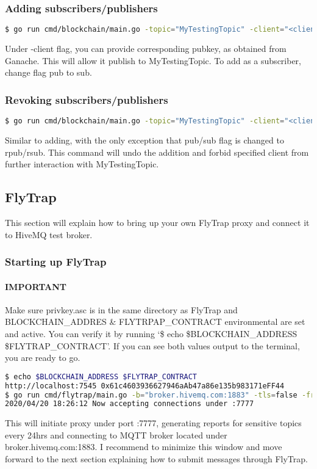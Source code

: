 \subsubsection{Adding subscribers/publishers}
\begin{lstlisting}[language=bash,breaklines=true]
$ go run cmd/blockchain/main.go -topic="MyTestingTopic" -client="<client_pubkey>" -pub="Addining a new publisher"
\end{lstlisting}
Under -client flag, you can provide corresponding pubkey, as obtained from Ganache. This will allow it publish to MyTestingTopic. To add as a subscriber, change flag pub to sub.
\subsubsection{Revoking subscribers/publishers}
\begin{lstlisting}[language=bash,breaklines=true]
$ go run cmd/blockchain/main.go -topic="MyTestingTopic" -client="<client_pubkey>" -rpub="Revoking publisher"
\end{lstlisting}
Similar to adding, with the only exception that pub/sub flag is changed to rpub/rsub. This command will undo the addition and forbid specified client from further interaction with MyTestingTopic.
\subsection{FlyTrap}
This section will explain how to bring up your own FlyTrap proxy and connect it to HiveMQ test broker.
\subsubsection{Starting up FlyTrap}
\paragraph{IMPORTANT} Make sure privkey.asc is in the same directory as FlyTrap and BLOCKCHAIN\_ADDRES \& FLYTRPAP\_CONTRACT environmental are set and active. You can verify it by running `\$ echo \$BLOCKCHAIN\_ADDRESS \$FLYTRAP\_CONTRACT'. If you can see both values output to the terminal, you are ready to go.
\begin{lstlisting}[language=bash,breaklines=true]
$ echo $BLOCKCHAIN_ADDRESS $FLYTRAP_CONTRACT
http://localhost:7545 0x61c4603936627946aAb47a86e135b983171eFF44
$ go run cmd/flytrap/main.go -b="broker.hivemq.com:1883" -tls=false -freq=24h -p ":7777"
2020/04/20 18:26:12 Now accepting connections under :7777
\end{lstlisting}
This will initiate proxy under port :7777, generating reports for sensitive topics every 24hrs and connecting to MQTT broker located under broker.hivemq.com:1883. I recommend to minimize this window and move forward to the next section explaining how to submit messages through FlyTrap.
